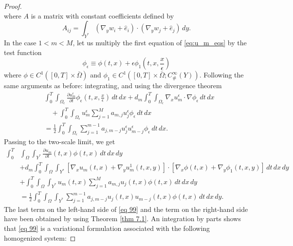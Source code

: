 \begin{proof}
\begin{equation}
\label{eq 97}\end{equation}
where $A$ is a matrix with constant coefficients defined by
$$
A_{i j}=\int_{Y^{*}}\left(\nabla_{y} w_{i}+\hat{e}_{i}\right) \cdot\left(\nabla_{y} w_{j}+\hat{e}_{j}\right) \, d  y .
$$
In the case $1<m<M$, let us multiply the first equation of \eqref{eq:u_m_eqs} by the test function
$$
\phi_{\epsilon} \equiv \phi(t, x)+\epsilon \phi_{1}\left(t, x, \frac{x}{\epsilon}\right)
$$
where $\phi \in C^{1}([0, T] \times \bar{\Omega})$ and $\phi_{1} \in C^{1}\left([0, T] \times \bar{\Omega} ; C_{\#}^{\infty}(Y)\right)$. Following the same arguments as before: integrating, and using the divergence theorem 
\begin{equation}
 \begin{aligned}
&\int_{0}^{T} \int_{\Omega_{\epsilon}} \frac{\partial u_{m}^{\epsilon}}{\partial t} \phi_{\epsilon}\left(t, x, \frac{x}{\epsilon}\right) \, d  t \, d  x+d_{m} \int_{0}^{T} \int_{\Omega_{\epsilon}} \nabla_{x} u_{m}^{\epsilon} \cdot \nabla \phi_{\epsilon} \, d  t \, d  x \\
&\quad+\int_{0}^{T} \int_{\Omega_{\epsilon}} u_{m}^{\epsilon} \sum_{j=1}^{M} a_{m, j} u_{j}^{\epsilon} \phi_{\epsilon} \, d  t \, d  x \\
&=\frac{1}{2} \int_{0}^{T} \int_{\Omega_{\epsilon}} \sum_{j=1}^{m-1} a_{j, m-j} u_{j}^{\epsilon} u_{m-j}^{\epsilon} \phi_{\epsilon} \, d  t \, d  x.
\end{aligned}
\label{eq 98}\end{equation}
Passing to the two-scale limit, we get 
\begin{equation}
 \begin{aligned}
\int_{0}^{T} & \int_{\Omega} \int_{Y^{*}} \frac{\partial u_{m}}{\partial t}(t, x) \phi(t, x) \, d  t \, d  x \, d  y \\
&+d_{m} \int_{0}^{T} \int_{\Omega} \int_{Y^{*}}\left[\nabla_{x} u_{m}(t, x)+\nabla_{y} u_{m}^{1}(t, x, y)\right] \cdot\left[\nabla_{x} \phi(t, x)+\nabla_{y} \phi_{1}(t, x, y)\right] \, d  t \, d  x \, d  y \\
&+\int_{0}^{T} \int_{\Omega} \int_{Y^{*}} u_{m}(t, x) \sum_{j=1}^{M} a_{m, j} u_{j}(t, x) \phi(t, x) \, d  t \, d  x \, d  y \\
&=\frac{1}{2} \int_{0}^{T} \int_{\Omega} \int_{Y^{*}} \sum_{j=1}^{m-1} a_{j, m-j} u_{j}(t, x) u_{m-j}(t, x) \phi(t, x) \, d  t \, d  x \, d  y.
\end{aligned}
\label{eq 99}\end{equation}
The last term on the left-hand side of \eqref{eq 99} and the term on the right-hand side have been obtained by using Theorem \eqref{thm 7.1}. An integration by parts shows that \eqref{eq 99} is a variational formulation associated with the following homogenized system:

\end{proof}
